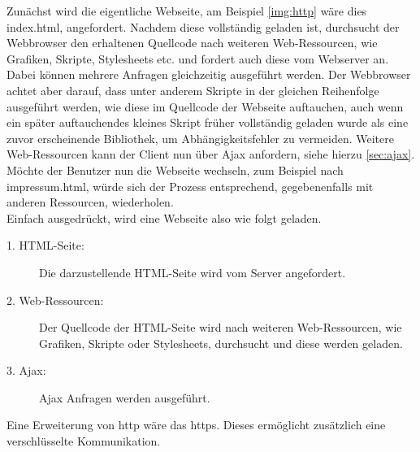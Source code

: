 Zunächst wird die eigentliche Webseite, am Beispiel \autoref{img:http} wäre dies index.html, angefordert. Nachdem diese vollständig geladen ist, durchsucht der Webbrowser den erhaltenen Quellcode nach weiteren Web-Ressourcen, wie Grafiken, Skripte, Stylesheets etc. und fordert auch diese vom Webserver an. Dabei können mehrere Anfragen gleichzeitig ausgeführt werden. Der Webbrowser achtet aber darauf, dass unter anderem Skripte in der gleichen Reihenfolge ausgeführt werden, wie diese im Quellcode der Webseite auftauchen, auch wenn ein später auftauchendes kleines Skript früher vollständig geladen wurde als eine zuvor erscheinende Bibliothek, um Abhängigkeitsfehler zu vermeiden. Weitere Web-Ressourcen kann der Client nun über Ajax anfordern, siehe hierzu \autoref{sec:ajax}. \\
Möchte der Benutzer nun die Webseite wechseln, zum Beispiel nach impressum.html, würde sich der Prozess entsprechend, gegebenenfalls mit anderen Ressourcen, wiederholen. \\
Einfach ausgedrückt, wird eine Webseite also wie folgt geladen.

\begin{description}
	\item[1. HTML-Seite:] Die darzustellende HTML-Seite wird vom Server angefordert.
	\item[2. Web-Ressourcen:] Der Quellcode der HTML-Seite wird nach weiteren Web-Ressourcen, wie Grafiken, Skripte oder Stylesheets, durchsucht und diese werden geladen.
	\item[3. Ajax:] Ajax Anfragen werden ausgeführt.
\end{description}

Eine Erweiterung von \ac{http} wäre das \ac{https}. Dieses ermöglicht zusätzlich eine verschlüsselte Kommunikation.